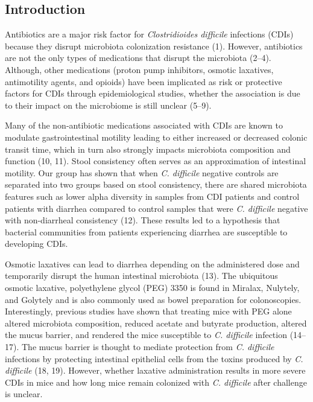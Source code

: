 \documentclass[
  11pt,
]{article}
\begin{document}
\newpage

\hypertarget{introduction}{%
\subsection{Introduction}\label{introduction}}

Antibiotics are a major risk factor for \emph{Clostridioides difficile}
infections (CDIs) because they disrupt microbiota colonization
resistance (1). However, antibiotics are not the only types of
medications that disrupt the microbiota (2--4). Although, other
medications (proton pump inhibitors, osmotic laxatives, antimotility
agents, and opioids) have been implicated as risk or protective factors
for CDIs through epidemiological studies, whether the association is due
to their impact on the microbiome is still unclear (5--9).

Many of the non-antibiotic medications associated with CDIs are known to
modulate gastrointestinal motility leading to either increased or
decreased colonic transit time, which in turn also strongly impacts
microbiota composition and function (10, 11). Stool consistency often
serves as an approximation of intestinal motility. Our group has shown
that when \emph{C. difficile} negative controls are separated into two
groups based on stool consistency, there are shared microbiota features
such as lower alpha diversity in samples from CDI patients and control
patients with diarrhea compared to control samples that were \emph{C.
difficile} negative with non-diarrheal consistency (12). These results
led to a hypothesis that bacterial communities from patients
experiencing diarrhea are susceptible to developing CDIs.

Osmotic laxatives can lead to diarrhea depending on the administered
dose and temporarily disrupt the human intestinal microbiota (13). The
ubiquitous osmotic laxative, polyethylene glycol (PEG) 3350 is found in
Miralax, Nulytely, and Golytely and is also commonly used as bowel
preparation for colonoscopies. Interestingly, previous studies have
shown that treating mice with PEG alone altered microbiota composition,
reduced acetate and butyrate production, altered the mucus barrier, and
rendered the mice susceptible to \emph{C. difficile} infection (14--17).
The mucus barrier is thought to mediate protection from \emph{C.
difficile} infections by protecting intestinal epithelial cells from the
toxins produced by \emph{C. difficile} (18, 19). However, whether
laxative administration results in more severe CDIs in mice and how long
mice remain colonized with \emph{C. difficile} after challenge is
unclear.
\end{document}
